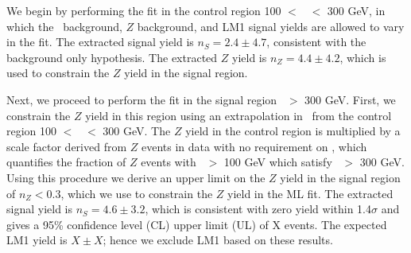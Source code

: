 We begin by performing the fit in the control region 100 $<$ \Ht\ $<$ 300 GeV, in
which the \ttbar\ background, $Z$ background, and LM1 signal yields are allowed to vary in the fit. 
The extracted signal yield is $n_S = 2.4 \pm 4.7$, consistent with the background only 
hypothesis. The extracted $Z$ yield is $n_Z = 4.4 \pm 4.2$, which is used to constrain
the $Z$ yield in the signal region. 

Next, we proceed to perform the fit in the signal region \Ht\ $>$ 300 GeV. First, we
constrain the $Z$ yield in this region using an extrapolation in \Ht\ from the 
control region 100 $<$ \Ht\ $<$ 300 GeV. The $Z$ yield in the control region is
multiplied by a scale factor derived from $Z$ events in data with no requirement
on \MET, which quantifies the fraction of $Z$ events with \Ht\ $>$ 100 GeV which 
satisfy \Ht\ $>$ 300 GeV. Using this procedure we derive an upper limit on the
$Z$ yield in the signal region of $n_Z < 0.3$, which we use to constrain the
$Z$ yield in the ML fit. The extracted signal yield is $n_S = 4.6 \pm 3.2$,
which is consistent with zero yield within 1.4$\sigma$ and gives a 95\% confidence
level (CL) upper limit (UL) of X events. The expected LM1 yield
is $X \pm X$; hence we exclude LM1 based on these results.




